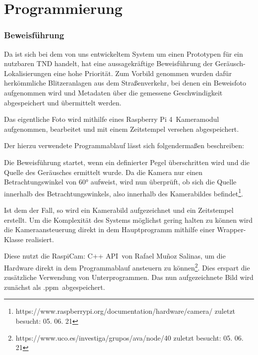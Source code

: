 \section{Programmierung}

\subsubsection{Beweisführung}

Da ist sich bei dem von uns entwickeltem System um einen Prototypen für ein nutzbaren TND handelt, hat eine aussagekräftige Beweisführung der Geräusch-Lokalisierungen eine hohe Priorität. Zum Vorbild genommen wurden dafür herkömmliche Blitzeranlagen aus dem Straßenverkehr, bei denen ein Beweisfoto aufgenommen wird und Metadaten über die gemessene Geschwindigkeit abgespeichert und übermittelt werden.

Das eigentliche Foto wird mithilfe eines \glqq Raspberry Pi 4\grqq\ Kameramodul aufgenommen, bearbeitet und mit einem Zeitstempel versehen abgespeichert. 

Der hierzu verwendete Programmablauf lässt sich folgendermaßen beschreiben: 


Die Beweisführung startet, wenn ein definierter Pegel überschritten wird und die Quelle des Geräusches ermittelt wurde. Da die Kamera nur einen Betrachtungswinkel von \ang{60} aufweist, wird nun überprüft, ob sich die Quelle innerhalb des Betrachtungswinkels, also innerhalb des Kamerabildes befindet\footnote{https://www.raspberrypi.org/documentation/hardware/camera/ zuletzt besucht: 05. 06. 21}.

Ist dem der Fall, so wird ein Kamerabild aufgezeichnet und ein Zeitstempel erstellt. Um die Komplexität des Systems möglichst gering halten zu können wird die Kameraansteuerung direkt in dem Hauptprogramm mithilfe einer Wrapper-Klasse realisiert. 

Diese nutzt die \glqq RaspiCam: C++ API\grqq\ von Rafael Muñoz Salinas, um die Hardware direkt in dem Programmablauf ansteuern zu können\footnote{https://www.uco.es/investiga/grupos/ava/node/40 zuletzt besucht: 05. 06. 21}. Dies erspart die zusätzliche Verwendung von Unterprogrammen. Das nun aufgezeichnete Bild wird zunächst als \glqq .ppm\grqq\ abgespeichert. 

